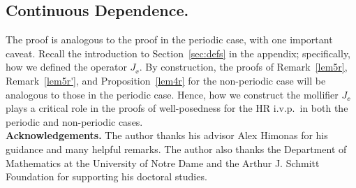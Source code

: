 \subsection{Continuous Dependence.} The proof is analogous to the proof in
the periodic case, with one important caveat. Recall the introduction to Section~\ref{sec:defs} in the appendix; specifically, how we defined the operator
$J_\ee$. By construction, the proofs of Remark~\ref{lem5r}, Remark~\ref{lem5r'}, and Proposition~\ref{lem4r} for the non-periodic case will be
analogous to those in the periodic case. Hence, how we
construct the mollifier $J_\ee$ plays a critical role in the proofs of
well-posedness for the HR i.v.p.\ in both the periodic and non-periodic cases. %
%
\\
\textbf{Acknowledgements.} The author thanks his advisor Alex Himonas for 
his guidance and many helpful remarks. The author also thanks the Department of 
Mathematics at the University of Notre Dame and the Arthur J. Schmitt Foundation for 
supporting his doctoral 
studies.
%
%

%
